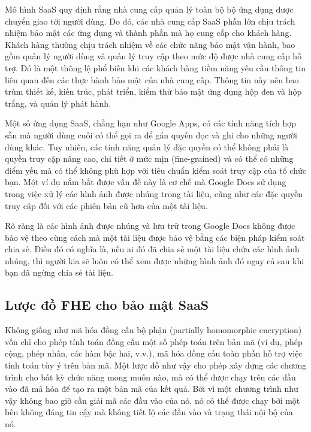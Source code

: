 Mô hình SaaS quy định rằng nhà cung cấp quản lý toàn bộ bộ ứng dụng được chuyển giao tới người dùng. Do đó, các nhà cung cấp SaaS phần lớn chịu trách nhiệm bảo mật các ứng dụng và thành phần mà họ cung cấp cho khách hàng. Khách hàng thường chịu trách nhiệm về các chức năng bảo mật vận hành, bao gồm quản lý người dùng và quản lý truy cập theo mức độ được nhà cung cấp hỗ trợ. Đó là một thông lệ phổ biến khi các khách hàng tiềm năng yêu cầu thông tin liên quan đến các thực hành bảo mật của nhà cung cấp. Thông tin này nên bao trùm thiết kế, kiến trúc, phát triển, kiểm thử bảo mật ứng dụng hộp đen và hộp trắng, và quản lý phát hành.

Một số ứng dụng SaaS, chẳng hạn như Google Apps, có các tính năng tích hợp sẵn mà người dùng cuối có thể gọi ra để gán quyền đọc và ghi cho những người dùng khác. Tuy nhiên, các tính năng quản lý đặc quyền có thể không phải là quyền truy cập nâng cao, chi tiết ở mức mịn (fine-grained) và có thể có những điểm yếu mà có thể không phù hợp với tiêu chuẩn kiểm soát truy cập của tổ chức bạn. Một ví dụ nắm bắt được vấn đề này là cơ chế mà Google Docs sử dụng trong việc xử lý các hình ảnh được nhúng trong tài liệu, cũng như các đặc quyền truy cập đối với các phiên bản cũ hơn của một tài liệu.

Rõ ràng là các hình ảnh được nhúng và lưu trữ trong Google Docs không được bảo vệ theo cùng cách mà một tài liệu được bảo vệ bằng các biện pháp kiểm soát chia sẻ. Điều đó có nghĩa là, nếu ai đó đã chia sẻ một tài liệu chứa các hình ảnh nhúng, thì người kia sẽ luôn có thể xem được những hình ảnh đó ngay cả sau khi bạn đã ngừng chia sẻ tài liệu.

\subsection{Lược đồ FHE cho bảo mật SaaS}

Không giống như mã hóa đồng cấu bộ phận (partially homomorphic encryption) vốn chỉ cho phép tính toán đồng cấu một số phép toán trên bản mã (ví dụ, phép cộng, phép nhân, các hàm bậc hai, v.v.), mã hóa đồng cấu toàn phần hỗ trợ việc tính toán tùy ý trên bản mã. Một lược đồ như vậy cho phép xây dựng các chương trình cho bất kỳ chức năng mong muốn nào, mà có thể được chạy trên các đầu vào đã mã hóa để tạo ra một bản mã của kết quả. Bởi vì một chương trình như vậy không bao giờ cần giải mã các đầu vào của nó, nó có thể được chạy bởi một bên không đáng tin cậy mà không tiết lộ các đầu vào và trạng thái nội bộ của nó.

